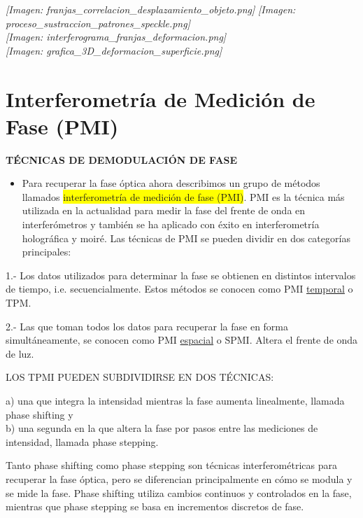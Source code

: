 \documentclass[12pt]{article}
\begin{document}
	\textit{[Imagen: franjas\_correlacion\_desplazamiento\_objeto.png]}
	\textit{[Imagen: proceso\_sustraccion\_patrones\_speckle.png]} \\
	\textit{[Imagen: interferograma\_franjas\_deformacion.png]} \\
	\textit{[Imagen: grafica\_3D\_deformacion\_superficie.png]}
	
	\section{Interferometría de Medición de Fase (PMI)}
	\colorbox{cyan!20}{\parbox{\textwidth}{
			\begin{center}
				\textbf{TÉCNICAS DE DEMODULACIÓN DE FASE}
			\end{center}
	}}
	
	\begin{itemize}
		\item Para recuperar la fase óptica ahora describimos un grupo de métodos llamados \colorbox{yellow}{interferometría de medición de fase (PMI)}. PMI es la técnica más utilizada en la actualidad para medir la fase del frente de onda en interferómetros y también se ha aplicado con éxito en interferometría holográfica y moiré. Las técnicas de PMI se pueden dividir en dos categorías principales:
	\end{itemize}
	
	1.- Los datos utilizados para determinar la fase se obtienen en distintos intervalos de tiempo, i.e. secuencialmente. Estos métodos se conocen como PMI \underline{temporal} o TPM.
	
	2.- Las que toman todos los datos para recuperar la fase en forma simultáneamente, se conocen como PMI \underline{espacial} o SPMI. Altera el frente de onda de luz.
	
	\colorbox{cyan!20}{\parbox{\textwidth}{
			LOS TPMI PUEDEN SUBDIVIDIRSE EN DOS TÉCNICAS:
	}}
	a) una que integra la intensidad mientras la fase aumenta linealmente, llamada \colorbox{cyan!20}{phase shifting} y \\
	b) una segunda en la que altera la fase por pasos entre las mediciones de intensidad, llamada \colorbox{cyan!20}{phase stepping}.
	
	Tanto phase shifting como phase stepping son técnicas interferométricas para recuperar la fase óptica, pero se diferencian principalmente en cómo se modula y se mide la fase. Phase shifting utiliza cambios continuos y controlados en la fase, mientras que phase stepping se basa en incrementos discretos de fase.
	
\end{document}

